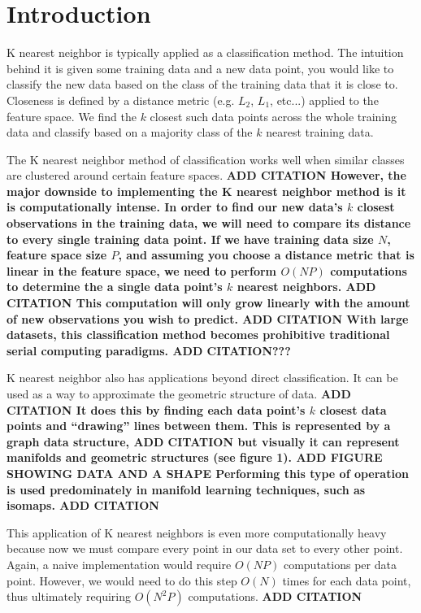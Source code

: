 \chapter{Introduction}

\vspace{5 mm}
\noindent
K nearest neighbor is typically applied as a classification method. The 
intuition behind it is given some training data and a new data point, you would 
like to classify the new data based on the class of the training data that it 
is close to. Closeness is defined by a distance metric (e.g. $L_{2}$, $L_{1}$, 
etc...) applied to the feature space. We find the $k$ closest such data points 
across the whole training data and classify based on a majority class of the 
$k$ nearest training data.

\vspace{5 mm}
\noindent
The K nearest neighbor method of classification works well when similar classes 
are clustered around certain feature spaces.
\bf{ADD CITATION} 
However, the major downside to 
implementing the K nearest neighbor method is it is computationally intense. 
In order to find our new data's $k$ closest observations in the training data, 
we will need to compare its distance to every single training data point. 
If we have training data size $N$, feature space size $P$, and assuming you 
choose a distance metric that is linear in the feature space, we need to 
perform $O(NP)$ computations to determine the a single data point's $k$ nearest 
neighbors.
\bf{ADD CITATION}
This computation will only grow linearly with the amount of new observations 
you wish to predict.
\bf{ADD CITATION}
With large datasets, this classification method becomes prohibitive traditional 
serial computing paradigms.
\bf{ADD CITATION???}

\vspace{5 mm}
\noindent
K nearest neighbor also has applications beyond direct classification. It can 
be used as a way to approximate the geometric structure of data.
\bf{ADD CITATION}
It does this by finding each data point's $k$ closest data points and 
``drawing'' lines between them. This is represented by a graph data structure, 
\bf{ADD CITATION} but visually it can represent manifolds and geometric 
structures (see figure 1).
\bf{ADD FIGURE SHOWING DATA AND A SHAPE} 
Performing this type of operation is used predominately in manifold learning 
techniques, such as isomaps.
\bf{ADD CITATION}

\vspace{5 mm}
\noindent
This application of K nearest neighbors is even more computationally heavy 
because now we must compare every point in our data set to every other point. 
Again, a naive implementation would require $O(NP)$ computations per data 
point. However, we would need to do this step $O(N)$ times for each data point, 
thus ultimately requiring $O(N^{2}P)$ computations.
\bf{ADD CITATION}


